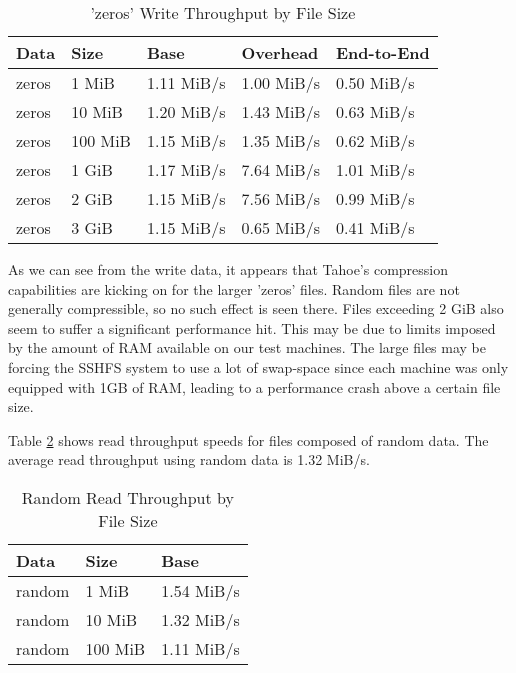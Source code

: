 \documentclass[11pt]{article}
\begin{document}
\begin{table}
  \begin{center}
    \begin{tabularx}{\textwidth}{|X|X|X|X|X|}
      \hline
      {\bf Data} & {\bf Size} & {\bf Base} & {\bf Overhead} & {\bf End-to-End} \\ \hline
      zeros & 1 MiB & 1.11 MiB/s & 1.00 MiB/s & 0.50 MiB/s \\ \hline
      zeros & 10 MiB & 1.20 MiB/s & 1.43 MiB/s & 0.63 MiB/s \\ \hline
      zeros & 100 MiB & 1.15 MiB/s & 1.35 MiB/s & 0.62 MiB/s \\ \hline
      zeros & 1 GiB & 1.17 MiB/s & 7.64 MiB/s & 1.01 MiB/s \\ \hline
      zeros & 2 GiB & 1.15 MiB/s & 7.56 MiB/s & 0.99 MiB/s \\ \hline
      zeros & 3 GiB & 1.15 MiB/s & 0.65 MiB/s & 0.41 MiB/s \\ \hline
    \end{tabularx}
    \caption{'zeros' Write Throughput by File Size}
    \label{tbl:TahoeWriteZeros}
  \end{center}
\end{table}

As we can see from the write data, it appears that Tahoe's compression
capabilities are kicking on for the larger 'zeros' files. Random files
are not generally compressible, so no such effect is seen there.
Files exceeding 2 GiB
also seem to suffer a significant performance hit. This may be due to
limits imposed by the amount of RAM available on our test
machines. The large files may be forcing the SSHFS system to use a lot of
swap-space since each machine was only equipped with 1GB of RAM, leading
to a performance crash above a certain file size.

Table \ref{tbl:TahoeReadRandom} shows read throughput speeds for files
composed of random data. The average read throughput using
random data is 1.32 MiB/s.

\begin{table}
  \begin{center}
    \begin{tabularx}{\textwidth}{|X|X|X|}
      \hline
      {\bf Data} & {\bf Size} & {\bf Base} \\ \hline
      random & 1 MiB & 1.54 MiB/s \\ \hline
      random & 10 MiB & 1.32 MiB/s \\ \hline
      random & 100 MiB & 1.11 MiB/s \\ \hline
    \end{tabularx}
    \caption{Random Read Throughput by File Size}
    \label{tbl:TahoeReadRandom}
  \end{center}
\end{table}
\end{document}
